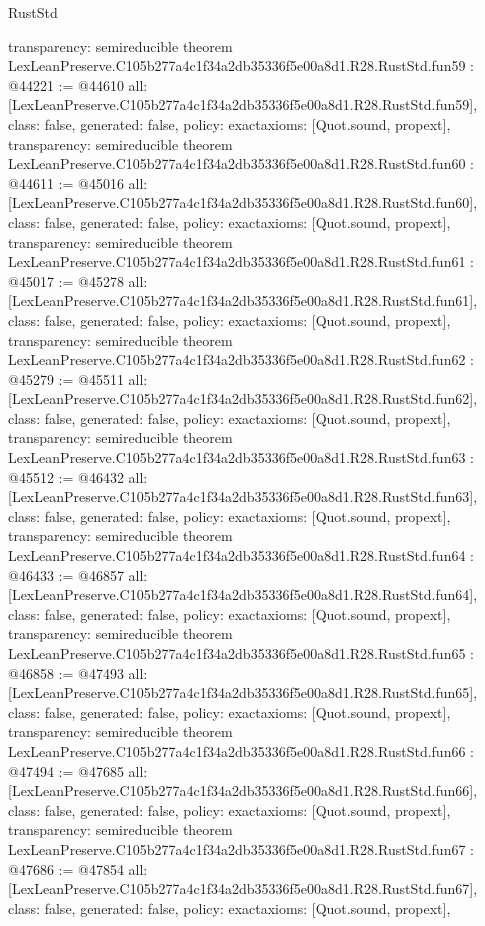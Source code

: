 \begin{lexlean}{RustStd}
\begin{coremodule}
{  transparency: semireducible
}
theorem LexLeanPreserve.C105b277a4c1f34a2db35336f5e00a8d1.R28.RustStd.fun59 : @44221 := @44610 {
  all: [LexLeanPreserve.C105b277a4c1f34a2db35336f5e00a8d1.R28.RustStd.fun59],
  class: false,
  generated: false,
  policy: exact{axioms: [Quot.sound, propext]},
  transparency: semireducible
}
theorem LexLeanPreserve.C105b277a4c1f34a2db35336f5e00a8d1.R28.RustStd.fun60 : @44611 := @45016 {
  all: [LexLeanPreserve.C105b277a4c1f34a2db35336f5e00a8d1.R28.RustStd.fun60],
  class: false,
  generated: false,
  policy: exact{axioms: [Quot.sound, propext]},
  transparency: semireducible
}
theorem LexLeanPreserve.C105b277a4c1f34a2db35336f5e00a8d1.R28.RustStd.fun61 : @45017 := @45278 {
  all: [LexLeanPreserve.C105b277a4c1f34a2db35336f5e00a8d1.R28.RustStd.fun61],
  class: false,
  generated: false,
  policy: exact{axioms: [Quot.sound, propext]},
  transparency: semireducible
}
theorem LexLeanPreserve.C105b277a4c1f34a2db35336f5e00a8d1.R28.RustStd.fun62 : @45279 := @45511 {
  all: [LexLeanPreserve.C105b277a4c1f34a2db35336f5e00a8d1.R28.RustStd.fun62],
  class: false,
  generated: false,
  policy: exact{axioms: [Quot.sound, propext]},
  transparency: semireducible
}
theorem LexLeanPreserve.C105b277a4c1f34a2db35336f5e00a8d1.R28.RustStd.fun63 : @45512 := @46432 {
  all: [LexLeanPreserve.C105b277a4c1f34a2db35336f5e00a8d1.R28.RustStd.fun63],
  class: false,
  generated: false,
  policy: exact{axioms: [Quot.sound, propext]},
  transparency: semireducible
}
theorem LexLeanPreserve.C105b277a4c1f34a2db35336f5e00a8d1.R28.RustStd.fun64 : @46433 := @46857 {
  all: [LexLeanPreserve.C105b277a4c1f34a2db35336f5e00a8d1.R28.RustStd.fun64],
  class: false,
  generated: false,
  policy: exact{axioms: [Quot.sound, propext]},
  transparency: semireducible
}
theorem LexLeanPreserve.C105b277a4c1f34a2db35336f5e00a8d1.R28.RustStd.fun65 : @46858 := @47493 {
  all: [LexLeanPreserve.C105b277a4c1f34a2db35336f5e00a8d1.R28.RustStd.fun65],
  class: false,
  generated: false,
  policy: exact{axioms: [Quot.sound, propext]},
  transparency: semireducible
}
theorem LexLeanPreserve.C105b277a4c1f34a2db35336f5e00a8d1.R28.RustStd.fun66 : @47494 := @47685 {
  all: [LexLeanPreserve.C105b277a4c1f34a2db35336f5e00a8d1.R28.RustStd.fun66],
  class: false,
  generated: false,
  policy: exact{axioms: [Quot.sound, propext]},
  transparency: semireducible
}
theorem LexLeanPreserve.C105b277a4c1f34a2db35336f5e00a8d1.R28.RustStd.fun67 : @47686 := @47854 {
  all: [LexLeanPreserve.C105b277a4c1f34a2db35336f5e00a8d1.R28.RustStd.fun67],
  class: false,
  generated: false,
  policy: exact{axioms: [Quot.sound, propext]},
}
\end{coremodule}
\end{lexlean}
